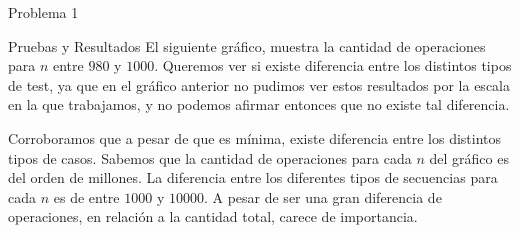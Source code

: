 \begin{section}{Problema 1}
\begin{subsection}{Pruebas y Resultados}
		El siguiente gráfico, muestra la cantidad de operaciones para $n$ entre $980$ y $1000$. Queremos ver si existe diferencia entre los distintos tipos de test, ya que en el gráfico anterior no pudimos ver estos resultados por la escala en la que trabajamos, y no podemos afirmar entonces que no existe tal diferencia.\\


		Corroboramos que a pesar de que es mínima, existe diferencia entre los distintos tipos de casos. Sabemos que la cantidad de operaciones para cada $n$ del gráfico es del orden de millones. La diferencia entre los diferentes tipos de secuencias para cada $n$ es de entre $1000$ y $10000$. A pesar de ser una gran diferencia de operaciones, en relación a la cantidad total, carece de importancia.

	\end{subsection}

\end{section}

